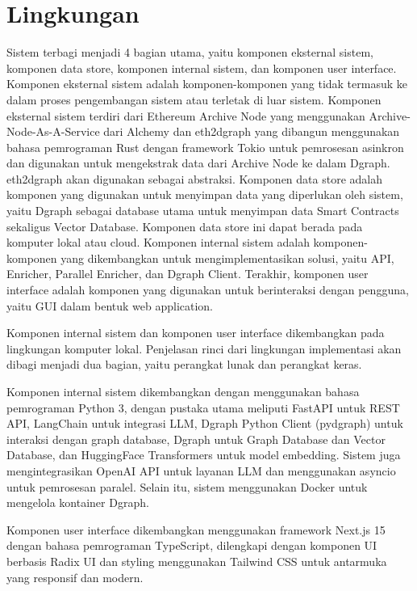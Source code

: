 \section{Lingkungan}
Sistem terbagi menjadi 4 bagian utama, yaitu komponen eksternal sistem, komponen data store, komponen internal sistem, dan komponen user interface. Komponen eksternal sistem adalah komponen-komponen yang tidak termasuk ke dalam proses pengembangan sistem atau terletak di luar sistem. Komponen eksternal sistem terdiri dari Ethereum Archive Node yang menggunakan Archive-Node-As-A-Service dari Alchemy dan eth2dgraph yang dibangun menggunakan bahasa pemrograman Rust dengan framework Tokio untuk pemrosesan asinkron dan digunakan untuk mengekstrak data dari Archive Node ke dalam Dgraph. eth2dgraph akan digunakan sebagai abstraksi. Komponen data store adalah komponen yang digunakan untuk menyimpan data yang diperlukan oleh sistem, yaitu Dgraph sebagai database utama untuk menyimpan data Smart Contracts sekaligus Vector Database. Komponen data store ini dapat berada pada komputer lokal atau cloud. Komponen internal sistem adalah komponen-komponen yang dikembangkan untuk mengimplementasikan solusi, yaitu API, Enricher, Parallel Enricher, dan Dgraph Client. Terakhir, komponen user interface adalah komponen yang digunakan untuk berinteraksi dengan pengguna, yaitu GUI dalam bentuk web application.

Komponen internal sistem dan komponen user interface dikembangkan pada lingkungan komputer lokal. Penjelasan rinci dari lingkungan implementasi akan dibagi menjadi dua bagian, yaitu perangkat lunak dan perangkat keras.

Komponen internal sistem dikembangkan dengan menggunakan bahasa pemrograman Python 3, dengan pustaka utama meliputi FastAPI untuk REST API, LangChain untuk integrasi LLM, Dgraph Python Client (pydgraph) untuk interaksi dengan graph database, Dgraph untuk Graph Database dan Vector Database, dan HuggingFace Transformers untuk model embedding. Sistem juga mengintegrasikan OpenAI API untuk layanan LLM dan menggunakan asyncio untuk pemrosesan paralel. Selain itu, sistem menggunakan Docker untuk mengelola kontainer Dgraph.

Komponen user interface dikembangkan menggunakan framework Next.js 15 dengan bahasa pemrograman TypeScript, dilengkapi dengan komponen UI berbasis Radix UI dan styling menggunakan Tailwind CSS untuk antarmuka yang responsif dan modern.

